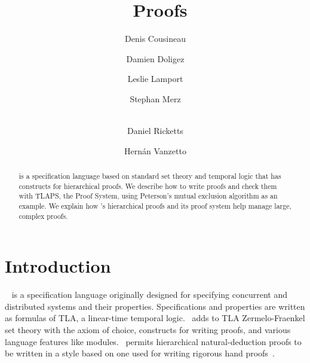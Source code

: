 \documentclass[a4paper]{llncs}
\begin{document}
\title{\tlaplus\ Proofs}
	

\author{
   Denis Cousineau \and
   Damien Doligez \and
   Leslie Lamport \and
   Stephan Merz \and \\
   Daniel Ricketts \and
   Hern\'an Vanzetto
}





\maketitle


\begin{abstract}

\tlaplus is a specification language based on standard set theory and
temporal logic that has constructs for hierarchical proofs.  We
describe how to write \tlaplus proofs and check them with TLAPS, the
\tlaplus Proof System, using Peterson's mutual exclusion algorithm as
an example.  We explain how \tlaplus's hierarchical proofs and its
proof system help manage large, complex proofs.

\end{abstract}



\section{Introduction} 

\tlaplus~\cite{lamport03tla} is a specification language originally
designed for specifying concurrent and distributed systems and their
properties.  Specifications and properties are written as formulas of
TLA, a linear-time temporal logic.  \tlaplus\ adds to TLA
Zermelo-Fraenkel set theory with the axiom of choice, constructs for
writing proofs, and various language features like modules.  \tlaplus\
permits hierarchical natural-deduction proofs to be written in a style
based on one used for writing rigorous hand
proofs~\cite{lamport93amm}.
\end{document}
